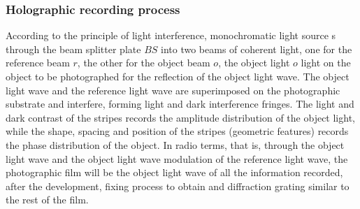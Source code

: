 \documentclass[UTF8]{article}
\begin{document}
    \subsubsection{Holographic recording process}
    According to the principle of light interference, monochromatic light source s through the beam splitter plate $BS$ into two beams of coherent light, one for the reference beam $r$, the other for the object beam $o$, the object light $o$ light on the object to be photographed for the reflection of the object light wave. The object light wave and the reference light wave are superimposed on the photographic substrate and interfere, forming light and dark interference fringes. The light and dark contrast of the stripes records the amplitude distribution of the object light, while the shape, spacing and position of the stripes (geometric features) records the phase distribution of the object. In radio terms, that is, through the object light wave and the object light wave modulation of the reference light wave, the photographic film will be the object light wave of all the information recorded, after the development, fixing process to obtain and diffraction grating similar to the rest of the film.
\end{document}
